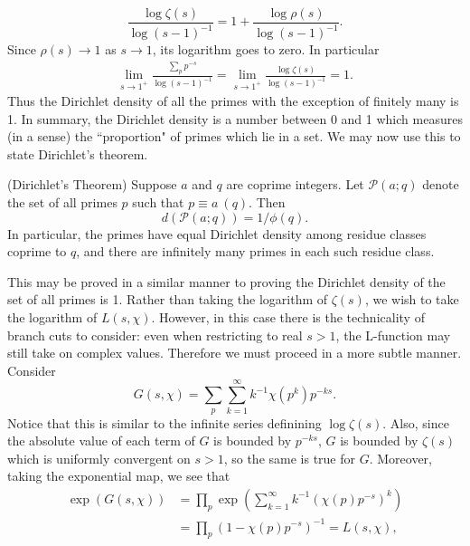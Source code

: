 \begin{equation}
    \frac{\log \zeta(s)}{\log(s - 1)^{-1}} = 1 + \frac{\log\rho(s)}{\log(s - 1)^{-1}}. \nonumber
\end{equation}
Since $\rho(s) \rightarrow 1$ as $s \rightarrow 1$, its logarithm goes to zero. In particular
\begin{align}
    \lim_{s \rightarrow 1^{+}}\frac{\sum_{p}p^{-s}}{\log(s - 1)^{-1}} = \lim_{s \rightarrow 1^{+}}\frac{\log\zeta(s)}{\log(s-1)^{-1}} = 1.
\end{align}
Thus the Dirichlet density of all the primes with the exception of finitely many is 1. In summary, the Dirichlet density is a number between 0 and 1 which measures (in a sense) the ``proportion" of primes which lie in a set. We may now use this to state Dirichlet's theorem.
\begin{theorem}
(Dirichlet's Theorem) Suppose $a$ and $q$ are coprime integers. Let $\mathcal{P}(a; q)$ denote the set of all primes $p$ such that $p \equiv a \ (q)$. Then
\begin{equation}
    d\left(\mathcal{P}(a; q)\right) = 1/\phi(q). \nonumber
\end{equation}
In particular, the primes have equal Dirichlet density among residue classes coprime to $q$, and there are infinitely many primes in each such residue class.
\end{theorem}
This may be proved in a similar manner to proving the Dirichlet density of the set of all primes is 1. Rather than taking the logarithm of $\zeta(s)$, we wish to take the logarithm of $L(s, \chi)$. However, in this case there is the technicality of branch cuts to consider: even when restricting to real $s > 1$, the L-function may still take on complex values. Therefore we must proceed in a more subtle manner. Consider 
\begin{equation}
    G(s, \chi) = \sum_{p}\sum_{k=1}^{\infty} k^{-1}\chi(p^{k})p^{-ks}. \nonumber
\end{equation}
Notice that this is similar to the infinite series definining $\log\zeta(s)$. Also, since the absolute value of each term of $G$ is bounded by $p^{-ks}$, $G$ is bounded by $\zeta(s)$ which is uniformly convergent on $s > 1$, so the same is true for $G$. Moreover, taking the exponential map, we see that
\begin{align}
    \exp(G(s, \chi)) &= \prod_{p} \exp\left(\sum_{k=1}^{\infty}k^{-1}(\chi(p)p^{-s})^{k}\right) \nonumber \\
    &= \prod_{p} (1 - \chi(p)p^{-s})^{-1} = L(s, \chi), \nonumber
\end{align}
